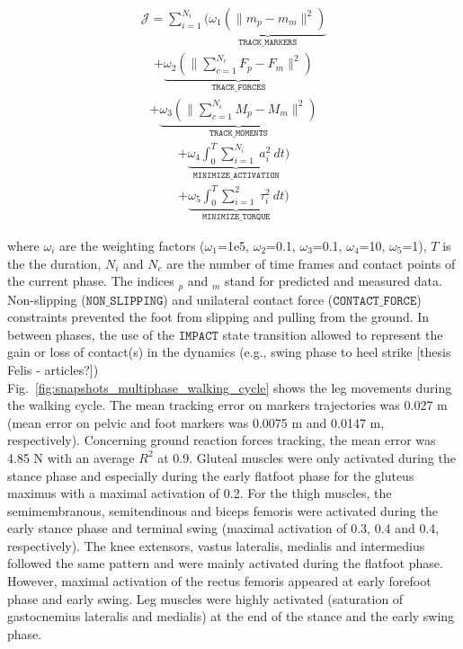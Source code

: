 \begin{eqnarray}
\label{eq:ocp_markers}
\mathcal{J} = \sum_{i=1}^{N_i}\Bigg(\underbrace{\omega_1(\|m_p - m_m\|^{2})}_{\mathtt{TRACK\_MARKERS}}
\end{eqnarray}
\begin{eqnarray}
\label{eq:ocp_forces}
+ \underbrace{\omega_2(\|\sum_{c=1}^{N_c}F_p - F_m\|^{2})}_{\mathtt{TRACK\_FORCES}}
\end{eqnarray}
\begin{eqnarray}
\label{eq:ocp_moments}
+ \underbrace{\omega_3(\|\sum_{c=1}^{N_c}M_p - M_m\|^{2})}_{\mathtt{TRACK\_MOMENTS}}
\end{eqnarray}
\begin{eqnarray}
\label{eq:ocp_muscles}
+ \underbrace{\omega_4\int_0^T \sum_{i=1}^{N_i}~a_{i}^2~dt}_{\mathtt{MINIMIZE\_ ACTIVATION}})  
\end{eqnarray}
\begin{eqnarray}
\label{eq:ocp_torques}
+ \underbrace{\omega_5\int_0^T \sum_{i=1}^{2}~\tau_{i}^2~dt}_{\mathtt{MINIMIZE\_ TORQUE}}\bigg)
 \end{eqnarray}

where $\omega_{i}$ are the weighting factors ($\omega_1$=1e5, $\omega_2$=0.1, $\omega_3$=0.1, $\omega_4$=10, $\omega_5$=1), $T$ is the the duration, $N_i$ and $N_c$ are the number of time frames and contact points of the current phase. The indices $_p$ and $_m$ stand for predicted and measured data.\\

Non-slipping ($\mathtt{NON\_SLIPPING}$) and unilateral contact force ($\mathtt{CONTACT\_FORCE}$) constraints prevented the foot from slipping and pulling from the ground. 
In between phases, the use of the $\mathtt{IMPACT}$ state transition allowed to represent the gain or loss of contact(s) in the dynamics (e.g., swing phase to heel strike [thesis Felis - articles?]) \\

Fig.~\ref{fig:snapshots_multiphase_walking_cycle} shows the leg movements during the walking cycle. The mean tracking error on markers trajectories was 0.027 m (mean error on pelvic and foot markers was 0.0075 m and 0.0147 m, respectively). 
Concerning ground reaction forces tracking, the mean error was 4.85 N with an average $R^2$ at 0.9. 
Gluteal muscles were only activated during the stance phase and especially during the early flatfoot phase for the gluteus maximus with a maximal activation of 0.2. 
For the thigh muscles, the semimembranous, semitendinous and biceps femoris were activated during the early stance phase and terminal swing (maximal activation of 0.3, 0.4 and 0.4, respectively). 
The knee extensors, vastus lateralis, medialis and intermedius followed the same pattern and were mainly activated during the flatfoot phase. 
However, maximal activation of the rectus femoris appeared at early forefoot phase and early swing. Leg muscles were highly activated (saturation of gastocnemius lateralis and medialis) at the end of the stance and the early swing phase. 

